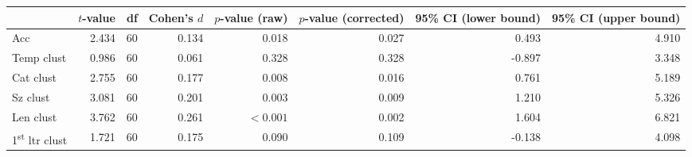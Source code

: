 \begin{tabular}{lrrrrrrr}
\toprule
{} & $t$-value & df & Cohen's $d$ & $p$-value (raw) & $p$-value (corrected) & 95\% CI (lower bound) & 95\% CI (upper bound) \\
\midrule
Acc                             &     2.434 & 60 &       0.134 &           0.018 &                 0.027 &                 0.493 &                 4.910 \\
Temp clust                      &     0.986 & 60 &       0.061 &           0.328 &                 0.328 &                -0.897 &                 3.348 \\
Cat clust                       &     2.755 & 60 &       0.177 &           0.008 &                 0.016 &                 0.761 &                 5.189 \\
Sz clust                        &     3.081 & 60 &       0.201 &           0.003 &                 0.009 &                 1.210 &                 5.326 \\
Len clust                       &     3.762 & 60 &       0.261 &       $< 0.001$ &                 0.002 &                 1.604 &                 6.821 \\
1\textsuperscript{st} ltr clust &     1.721 & 60 &       0.175 &           0.090 &                 0.109 &                -0.138 &                 4.098 \\
\bottomrule
\end{tabular}
